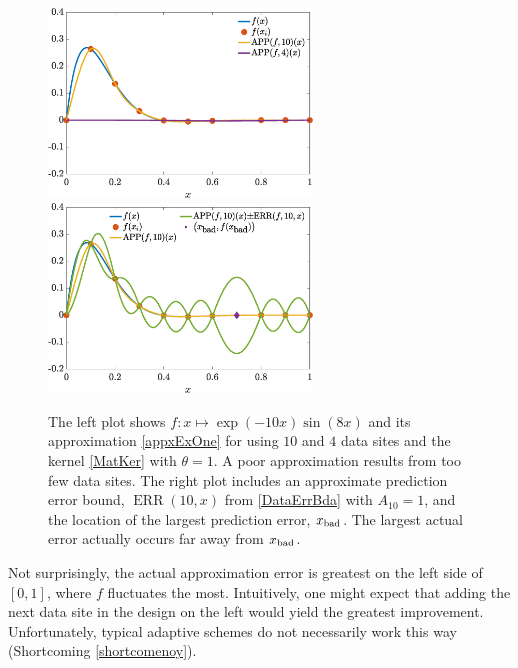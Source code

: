 \documentclass[11pt]{NSFamsart}
\DeclareMathOperator{\ERR}{ERR}
\begin{document}
\begin{figure}[H]
    \centering
    \includegraphics[width = 7cm]{ProgramsImages/fandDataAndAppxSmall.eps} \qquad \qquad
    \includegraphics[width = 7cm]{ProgramsImages/fandDataAndAppxAndRMSPE.eps}
    \caption{The left plot shows $f: x \mapsto \exp(-10x) \sin(8x)$ and its approximation \eqref{appxExOne} for using $10$ and $4$ data sites and the kernel \eqref{MatKer} with $\theta = 1$. A poor approximation results from too few data sites.  The right plot includes an approximate prediction error bound, $\ERR(10,x)$ from \eqref{DataErrBda} with $A_{10} =1$, and the location of the largest prediction error, $x_{\textup{bad}}$. The largest actual error actually occurs far away from $x_{\textup{bad}}$.}
    \label{fig:sampleFun}
\end{figure}

Not surprisingly, the actual approximation error is greatest on the left side of $[0,1]$, where $f$ fluctuates the most.  Intuitively, one might expect that adding the next data site in the design on the left would yield the greatest improvement.  Unfortunately, typical adaptive schemes do not necessarily work this way (Shortcoming \ref{shortcomenoy}).
\end{document}
